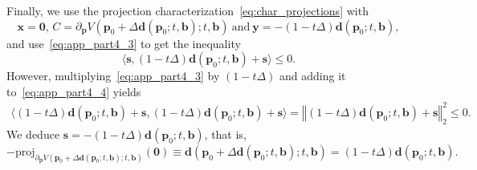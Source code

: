 \documentclass[11pt]{article}
\numberwithin{prop}{section}
\numberwithin{lem}{section}
\numberwithin{rem}{section}
\numberwithin{cor}{section}
\numberwithin{thm}{section}
\numberwithin{defn}{section}
\numberwithin{fact}{section}
\theoremstyle{plain}
\def\bb {\boldsymbol{b}}
\def\bd {\boldsymbol{d}}
\def\bp {\boldsymbol{p}}
\def\bs {\boldsymbol{s}}
\def\bx {\boldsymbol{x}}
\def\by {\boldsymbol{y}}
\newcommand{\normsq}[1]{\left\Vert{#1} \right\Vert_{2}^{2}}
\def\proj {\mathrm{proj}}
\def\bpo {\bp_{0}}
\begin{document}
Finally, we use the projection characterization~\eqref{eq:char_projections} with 
\[
\bx = \boldsymbol{0},\, C = \partial_{\bp}V(\bpo + \Delta\bd(\bpo;t,\bb);t,\bb) \ \text{and} \ \by = -(1-t\Delta)\bd(\bpo;t,\bb), 
\]
and use~\eqref{eq:app_part4_3} to get the inequality
\begin{equation}\label{eq:app_part4_4}
\langle\bs, (1-t\Delta)\bd(\bpo;t,\bb) + \bs\rangle \leqslant 0.
\end{equation}
However, multiplying~\eqref{eq:app_part4_3} by $(1-t \Delta)$ and adding it to~\eqref{eq:app_part4_4} yields
\[
\begin{alignedat}{1}
\langle(1-t \Delta)\bd(\bpo;t,\bb) + \bs,(1-t \Delta)\bd(\bpo;t,\bb) + \bs\rangle = \normsq{(1-t\Delta)\bd(\bpo;t,\bb) + \bs} \leqslant 0.
\end{alignedat}
\]
We deduce $\bs = -(1-t \Delta)\bd(\bpo;t,\bb)$, that is, 
\[
-\proj_{\partial_{\bp}V(\bpo+\Delta\bd(\bpo;t,\bb);t,\bb)}(\boldsymbol{0}) \equiv \bd(\bpo+\Delta\bd(\bpo;t,\bb);t,\bb) = (1-t \Delta)\bd(\bpo;t,\bb).
\]



\end{document}
